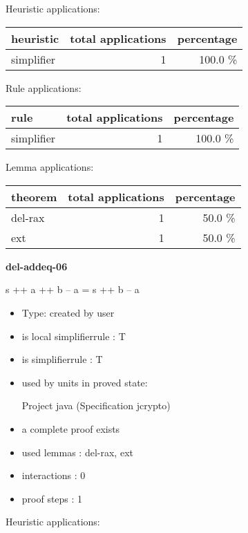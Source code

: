 \documentclass[a4paper]{article}
\begin{document}
\medskip


Heuristic applications:

\begin{supertabular}{l|r|r}
heuristic	& total applications & percentage \\ \hline
simplifier & 1 & 100.0 \% \\

\end{supertabular}

Rule applications:

\begin{supertabular}{l|r|r}
rule	        & total applications & percentage \\ \hline
simplifier & 1 & 100.0 \% \\

\end{supertabular}

Lemma applications:

\begin{supertabular}{l|r|r}
theorem	        & total applications & percentage \\ \hline
del-rax & 1 & 50.0 \% \\
ext & 1 & 50.0 \% \\

\end{supertabular}
\pagebreak

{\LARGE\bf del-addeq-06}\label{lemma-del-addeq-06}

\medskip

 \Fol s ++ a ++ b -- a = s ++ b -- a

\begin{itemize}

\item Type: created by user

\item is local simplifierrule : T
\item is simplifierrule : T
\item used by units in proved state:

Project java (Specification jcrypto)
\item       a complete proof exists
\item       used lemmas  : del-rax, ext
\item       interactions : 0
\item       proof steps  : 1
\end{itemize}

\medskip


Heuristic applications:
\end{document}
